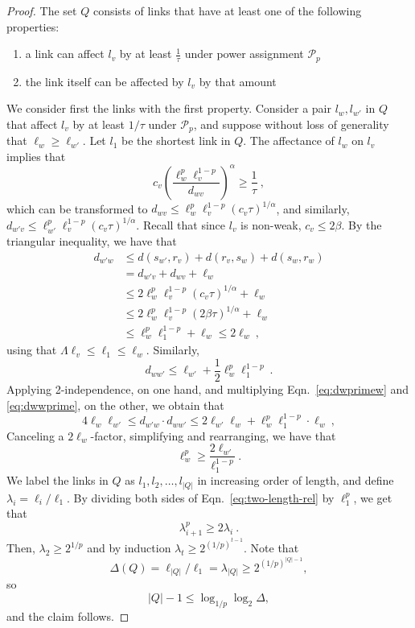 \documentclass[11pt]{amsart}
\newcommand{\cal}[1]{\mathcal{#1}}
\def\calP{{\cal P}}
\def\calP{{\cal P}}   \def\calM{{\cal M}}   \def\calU{{\cal U}}   \newcommand{\PCopt}{\overline{OPT}}
\newcommand{\powp}{\calP_p}
\begin{document}
\begin{proof}
The set $Q$ consists of links that have at least one of the following properties:
\begin{enumerate}
\item a link can affect $l_v$ by at least $\frac{1}{\tau}$ under power assignment $\powp$
\item the link itself can be affected by $l_v$ by that amount
\end{enumerate}
We consider first the links with the first property. Consider a pair $l_w, l_{w'}$ in $Q$ that affect $l_v$ by at least $1/\tau$ under $\powp$, 
and suppose without loss of generality that $\ell_w \ge \ell_{w'}$.
Let $l_1$ be the shortest link in $Q$.
The affectance of $l_w$ on $l_v$ implies that
\[  c_v \left(\frac{\ell_w^p \ell_v^{1-p}}{d_{wv}}\right)^\alpha  
        \ge \frac{1}{\tau}\ , \]
which can be transformed to 
$d_{wv} \le \ell_w^p \ell_v^{1-p} (c_v \tau)^{1/\alpha}$, 
and similarly, $d_{w'v} \le \ell_{w'}^p \ell_v^{1-p} (c_v \tau)^{1/\alpha}$.
Recall that since $l_v$ is non-weak, $c_v \le 2\beta$.
By the triangular inequality, we have that 
\begin{align}\label{eq:dwprimew}
d_{w'w} & \le  d(s_{w'}, r_v) + d(r_v,s_w) + d(s_w, r_w) \\\nonumber
				& = 	 d_{w'v} + d_{wv} + \ell_w \\\nonumber
				& \le  2 \ell_w^p \ell_v^{1-p} (c_v\tau)^{1/\alpha} + \ell_{w}  \\\nonumber
				& \le  2 \ell_w^p \ell_v^{1-p} (2\beta\tau)^{1/\alpha} + \ell_{w}  \\\nonumber
				& \le  \ell_w^p \ell_1^{1-p} + \ell_{w} \le 2\ell_w \ ,\end{align}
using that $\Lambda\ell_v \le \ell_1 \le \ell_w$.
Similarly, 
\begin{equation}
d_{w w'}  \le \ell_{w'} + \frac{1}{2}\ell_w^p \ell_1^{1-p} \ .
\label{eq:dwwprime}
\end{equation}
Applying 2-independence, on one hand, and multiplying Eqn.\ \ref{eq:dwprimew} and \ref{eq:dwwprime}, on the other, we obtain that
\begin{equation}
4 \ell_w \ell_{w'} \le d_{w'w} \cdot d_{w w'} 
   \le 2 \ell_{w'} \ell_w  + \ell_w^p \ell_1^{1-p} \cdot \ell_w\ ,
\label{eq:t2}
\end{equation}
Canceling a $2\ell_w$-factor, simplifying and rearranging,
we have that
\begin{equation}
\ell_w^p \ge \frac{2 \ell_{w'}}{\ell_1^{1-p}}\ .
\label{eq:two-length-rel}
\end{equation}
We label the links in $Q$ as $l_1, l_2, \ldots, l_{|Q|}$ in 
increasing order of length, and define $\lambda_i = \ell_i / \ell_1$.
By dividing both sides of Eqn.\ \ref{eq:two-length-rel} by $\ell_1^p$, 
we get that
\[ \lambda_{i+1}^{p} \ge 2 \lambda_i\ . \]
Then, $\lambda_2 \ge 2^{1/p}$ and 
by induction $\lambda_{t} \ge 2^{(1/p)^{t-1}}$.
Note that 
\[\Delta(Q)=\ell_{|Q|}/\ell_1 = \lambda_{|Q|}\geq 2^{(1/p)^{|Q|-1}},\]
 so
\[|Q|-1 \le \log_{1/p} \log_2 \Delta,\] and the claim follows.


\end{proof}
\end{document}

